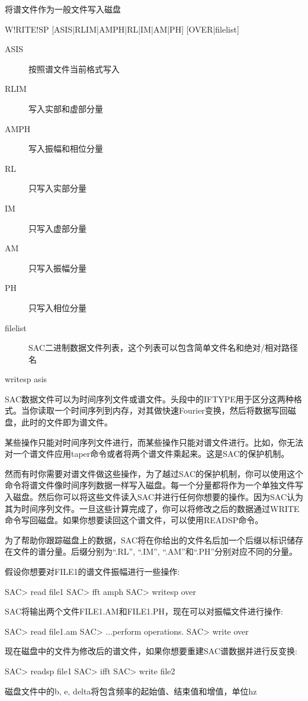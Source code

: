 \label{cmd:writesp}

将谱文件作为一般文件写入磁盘

\begin{SACSTX}
W!RITE!SP [ASIS|RLIM|AMPH|RL|IM|AM|PH] [OVER|filelist]
\end{SACSTX}

\begin{description}
\item [ASIS]  按照谱文件当前格式写入
\item [RLIM]  写入实部和虚部分量
\item [AMPH]  写入振幅和相位分量
\item [RL]  只写入实部分量
\item [IM]  只写入虚部分量
\item [AM]  只写入振幅分量
\item [PH]  只写入相位分量
\item [filelist]  SAC二进制数据文件列表，这个列表可以包含简单文件名和绝对/相对路径名
\end{description}

\begin{SACDFT}
writesp asis
\end{SACDFT}

SAC数据文件可以为时间序列文件或谱文件。头段中的IFTYPE用于区分这两种格式。当你读取一个时间序列到内存，对其做快速Fourier变换，然后将数据写回磁盘，此时的文件即为谱文件。

某些操作只能对时间序列文件进行，而某些操作只能对谱文件进行。比如，你无法对一个谱文件应用taper命令或者将两个谱文件乘起来。这是SAC的保护机制。

然而有时你需要对谱文件做这些操作，为了越过SAC的保护机制，你可以使用这个命令将谱文件像时间序列数据一样写入磁盘。每一个分量都将作为一个单独文件写入磁盘。然后你可以将这些文件读入SAC并进行任何你想要的操作。因为SAC认为其为时间序列文件。一旦这些计算完成了，你可以将修改之后的数据通过WRITE命令写回磁盘。如果你想要读回这个谱文件，可以使用READSP命令。

为了帮助你跟踪磁盘上的数据，SAC将在你给出的文件名后加一个后缀以标识储存在文件的谱分量。后缀分别为``.RL'', ``.IM'', ``.AM''和``.PH''分别对应不同的分量。

假设你想要对FILE1的谱文件振幅进行一些操作:
\begin{SACCode}
SAC> read file1
SAC> fft amph
SAC> writesp over
\end{SACCode}

SAC将输出两个文件FILE1.AM和FILE1.PH，现在可以对振幅文件进行操作:
\begin{SACCode}
SAC> read file1.am
SAC> ...perform operations.
SAC> write over
\end{SACCode}

现在磁盘中的文件为修改后的谱文件，如果你想要重建SAC谱数据并进行反变换:
\begin{SACCode}
SAC> readsp file1
SAC> ifft
SAC> write file2
\end{SACCode}

磁盘文件中的b, e, delta将包含频率的起始值、结束值和增值，单位hz


